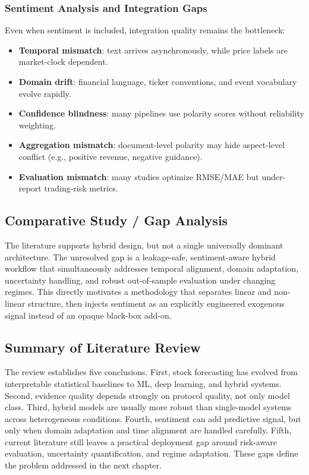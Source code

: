 \documentclass[12pt,a4paper]{article}
\begin{document}
\subsubsection{Sentiment Analysis and Integration Gaps}
\label{sec:sentiment_gaps}
Even when sentiment is included, integration quality remains the bottleneck:
\begin{itemize}
    \item \textbf{Temporal mismatch}: text arrives asynchronously, while price labels are market-clock dependent.
    \item \textbf{Domain drift}: financial language, ticker conventions, and event vocabulary evolve rapidly.
    \item \textbf{Confidence blindness}: many pipelines use polarity scores without reliability weighting.
    \item \textbf{Aggregation mismatch}: document-level polarity may hide aspect-level conflict (e.g., positive revenue, negative guidance).
    \item \textbf{Evaluation mismatch}: many studies optimize RMSE/MAE but under-report trading-risk metrics.
\end{itemize}

\subsection{Comparative Study / Gap Analysis}
The literature supports hybrid design, but not a single universally dominant architecture. The unresolved gap is a leakage-safe, sentiment-aware hybrid workflow that simultaneously addresses temporal alignment, domain adaptation, uncertainty handling, and robust out-of-sample evaluation under changing regimes. This directly motivates a methodology that separates linear and non-linear structure, then injects sentiment as an explicitly engineered exogenous signal instead of an opaque black-box add-on.

\subsection{Summary of Literature Review}
The review establishes five conclusions. First, stock forecasting has evolved from interpretable statistical baselines to ML, deep learning, and hybrid systems. Second, evidence quality depends strongly on protocol quality, not only model class. Third, hybrid models are usually more robust than single-model systems across heterogeneous conditions. Fourth, sentiment can add predictive signal, but only when domain adaptation and time alignment are handled carefully. Fifth, current literature still leaves a practical deployment gap around risk-aware evaluation, uncertainty quantification, and regime adaptation. These gaps define the problem addressed in the next chapter.
\end{document}
